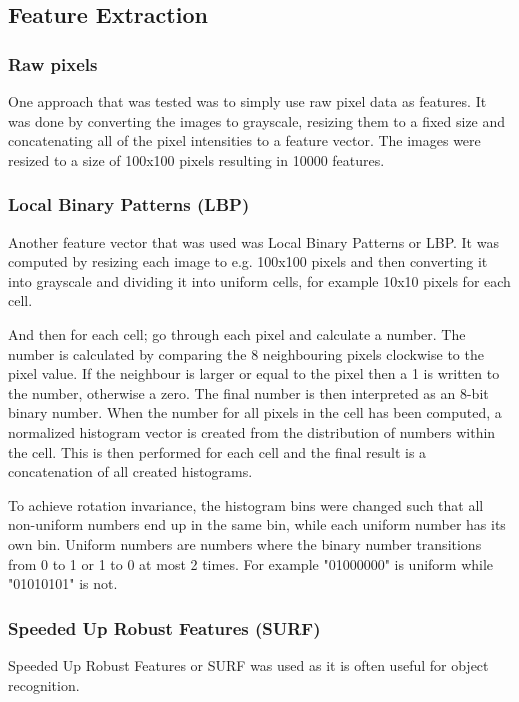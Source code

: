 \documentclass[doc/report.tex]{subfiles}
\begin{document}
\subsection{Feature Extraction}

\subsubsection{Raw pixels}
One approach that was tested was to simply use raw pixel data as features. It
was done by converting the images to grayscale, resizing them to a fixed size
and concatenating all of the pixel intensities to a feature vector. The images
were resized to a size of 100x100 pixels resulting in 10000 features.

\subsubsection{Local Binary Patterns (LBP)}
Another feature vector that was used was Local Binary Patterns or LBP. It was
computed by resizing each image to e.g. 100x100 pixels and then converting it
into grayscale and dividing it into uniform cells, for example 10x10 pixels for
each cell.

And then for each cell; go through each pixel and calculate a number. The
number is calculated by comparing the 8 neighbouring pixels clockwise to the
pixel value. If the neighbour is larger or equal to the pixel then a 1 is
written to the number, otherwise a zero. The final number is then interpreted
as an 8-bit binary number. When the number for all pixels in the cell has been
computed, a normalized histogram vector is created from the distribution of
numbers within the cell. This is then performed for each cell and the final
result is a concatenation of all created histograms.

To achieve rotation invariance, the histogram bins were changed such that all
non-uniform numbers end up in the same bin, while each uniform number has its
own bin. Uniform numbers are numbers where the binary number transitions from 0
to 1 or 1 to 0 at most 2 times. For example "01000000" is uniform while
"01010101" is not.

\subsubsection{Speeded Up Robust Features (SURF)}
Speeded Up Robust Features or SURF was used as it is often useful for object
recognition.
\end{document}
